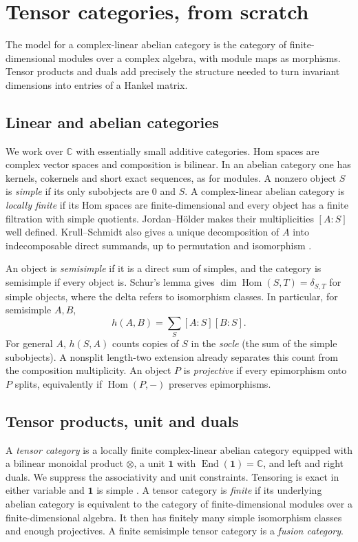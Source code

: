 \documentclass[11pt,reqno]{amsart}
\theoremstyle{definition}
\newcommand{\Hom}{\operatorname{Hom}}
\newcommand{\End}{\operatorname{End}}
\newcommand{\one}{\mathbf 1}
\newcommand{\CC}{\mathbb C}
\begin{document}
\section{Tensor categories, from scratch}\label{sec:tensor}
The model for a complex-linear abelian category is the category of finite-dimensional modules over a complex algebra, with module maps as morphisms. Tensor products and duals add precisely the structure needed to turn invariant dimensions into entries of a Hankel matrix.

\subsection{Linear and abelian categories}
We work over $\CC$ with essentially small additive categories. Hom spaces are complex vector spaces and composition is bilinear. In an abelian category one has kernels, cokernels and short exact sequences, as for modules. A nonzero object $S$ is \emph{simple} if its only subobjects are $0$ and $S$. A complex-linear abelian category is \emph{locally finite} if its Hom spaces are finite-dimensional and every object has a finite filtration with simple quotients. Jordan--H\"older makes their multiplicities $[A:S]$ well defined. Krull--Schmidt also gives a unique decomposition of $A$ into indecomposable direct summands, up to permutation and isomorphism \cite[\S1.5]{EGNO}.

An object is \emph{semisimple} if it is a direct sum of simples, and the category is semisimple if every object is. Schur's lemma gives $\dim\Hom(S,T)=\delta_{S,T}$ for simple objects, where the delta refers to isomorphism classes. In particular, for semisimple $A,B$,
\begin{equation}\label{eq:mult-form}
 h(A,B)=\sum_S[A:S][B:S].
\end{equation}
For general $A$, $h(S,A)$ counts copies of $S$ in the \emph{socle} (the sum of the simple subobjects). A nonsplit length-two extension already separates this count from the composition multiplicity. An object $P$ is \emph{projective} if every epimorphism onto $P$ splits, equivalently if $\Hom(P,-)$ preserves epimorphisms.

\subsection{Tensor products, unit and duals}
A \emph{tensor category} is a locally finite complex-linear abelian category equipped with a bilinear monoidal product $\otimes$, a unit $\one$ with $\End(\one)=\CC$, and left and right duals. We suppress the associativity and unit constraints. Tensoring is exact in either variable and $\one$ is simple \cite[Definition~4.1.1, Proposition~4.2.1 and Theorem~4.3.8(i)]{EGNO}. A tensor category is \emph{finite} if its underlying abelian category is equivalent to the category of finite-dimensional modules over a finite-dimensional algebra. It then has finitely many simple isomorphism classes and enough projectives. A finite semisimple tensor category is a \emph{fusion category}.
\end{document}
